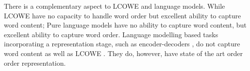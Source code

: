 \documentclass{book}
\begin{document}
There is a complementary aspect to LCOWE and language models.
While LCOWE have no capacity to handle word order but excellent ability to capture word content;
Pure language models have no ability to capture word content, but excellent ability to capture word order.
Language modelling based tasks incorporating a representation stage, such as encoder-decoders \citep{cho-EtAl:2014:EMNLP2014}, do not capture word content as well as LCOWE \citep{ac2018probingsentencevectors}.
They do, however, have state of the art order order representation.
%
%
%
%
%
%	
%	
%	
%	
%	
%			
%	
%	
%
\end{document}
